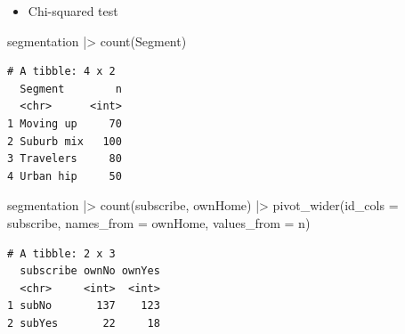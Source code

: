\documentclass[
  ignorenonframetext,
]{beamer}
\newenvironment{Shaded}{\begin{snugshade}}{\end{snugshade}}
\newcommand{\AttributeTok}[1]{\textcolor[rgb]{0.40,0.45,0.13}{#1}}
\newcommand{\FunctionTok}[1]{\textcolor[rgb]{0.28,0.35,0.67}{#1}}
\newcommand{\NormalTok}[1]{\textcolor[rgb]{0.00,0.23,0.31}{#1}}
\newcommand{\SpecialCharTok}[1]{\textcolor[rgb]{0.37,0.37,0.37}{#1}}
\providecommand{\tightlist}{%
  \setlength{\itemsep}{0pt}\setlength{\parskip}{0pt}}\usepackage{longtable,booktabs,array}
\begin{document}
\begin{frame}[fragile]{}
\label{section-3}
\begin{itemize}
\tightlist
\item
  Chi-squared test
\end{itemize}

\tiny

\begin{Shaded}
\begin{Highlighting}[]
\NormalTok{segmentation }\SpecialCharTok{|\textgreater{}} \FunctionTok{count}\NormalTok{(Segment)}
\end{Highlighting}
\end{Shaded}

\begin{verbatim}
# A tibble: 4 x 2
  Segment        n
  <chr>      <int>
1 Moving up     70
2 Suburb mix   100
3 Travelers     80
4 Urban hip     50
\end{verbatim}

\begin{Shaded}
\begin{Highlighting}[]
\NormalTok{segmentation }\SpecialCharTok{|\textgreater{}} 
  \FunctionTok{count}\NormalTok{(subscribe, ownHome) }\SpecialCharTok{|\textgreater{}} 
  \FunctionTok{pivot\_wider}\NormalTok{(}\AttributeTok{id\_cols =}\NormalTok{ subscribe,}
              \AttributeTok{names\_from =}\NormalTok{ ownHome,}
              \AttributeTok{values\_from =}\NormalTok{ n)}
\end{Highlighting}
\end{Shaded}

\begin{verbatim}
# A tibble: 2 x 3
  subscribe ownNo ownYes
  <chr>     <int>  <int>
1 subNo       137    123
2 subYes       22     18
\end{verbatim}
\end{frame}
\end{document}
